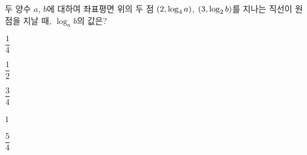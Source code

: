 두 양수 $a$, $b$에 대하여 좌표평면 위의 두 점 $(2{,}\mkern3mu\mathopen{}\log_4 a)$, $(3{,}\mkern3mu\mathopen{}\log_2 b)$를 지나는 직선이 원점을 지날 때, $\log_a b$의 값은? 
\begin{choices32}{\rule[-3ex]{0pt}{8ex}$\dfrac{1}{4}$}{\rule[-3ex]{0pt}{8ex}$\dfrac{1}{2}$}{\rule[-3ex]{0pt}{8ex}$\dfrac{3}{4}$}{\rule[-3ex]{0pt}{8ex}$1$}{\rule[-3ex]{0pt}{8ex}$\dfrac{5}{4}$}\end{choices32}
